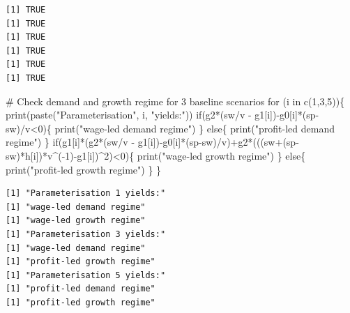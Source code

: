 \documentclass[
  letterpaper,
  DIV=11,
  numbers=noendperiod]{scrreprt}
\newenvironment{Shaded}{\begin{snugshade}}{\end{snugshade}}
\newcommand{\CommentTok}[1]{\textcolor[rgb]{0.37,0.37,0.37}{#1}}
\newcommand{\ControlFlowTok}[1]{\textcolor[rgb]{0.00,0.23,0.31}{#1}}
\newcommand{\DecValTok}[1]{\textcolor[rgb]{0.68,0.00,0.00}{#1}}
\newcommand{\FunctionTok}[1]{\textcolor[rgb]{0.28,0.35,0.67}{#1}}
\newcommand{\NormalTok}[1]{\textcolor[rgb]{0.00,0.23,0.31}{#1}}
\newcommand{\SpecialCharTok}[1]{\textcolor[rgb]{0.37,0.37,0.37}{#1}}
\newcommand{\StringTok}[1]{\textcolor[rgb]{0.13,0.47,0.30}{#1}}
\begin{document}
\begin{verbatim}
[1] TRUE
[1] TRUE
[1] TRUE
[1] TRUE
[1] TRUE
[1] TRUE
\end{verbatim}

\begin{Shaded}
\begin{Highlighting}[]
\CommentTok{\# Check demand and growth regime for 3 baseline scenarios}
\ControlFlowTok{for}\NormalTok{ (i }\ControlFlowTok{in} \FunctionTok{c}\NormalTok{(}\DecValTok{1}\NormalTok{,}\DecValTok{3}\NormalTok{,}\DecValTok{5}\NormalTok{))\{}
\FunctionTok{print}\NormalTok{(}\FunctionTok{paste}\NormalTok{(}\StringTok{"Parameterisation"}\NormalTok{, i, }\StringTok{"yields:"}\NormalTok{))   }
\ControlFlowTok{if}\NormalTok{(g2}\SpecialCharTok{*}\NormalTok{(sw}\SpecialCharTok{/}\NormalTok{v }\SpecialCharTok{{-}}\NormalTok{ g1[i])}\SpecialCharTok{{-}}\NormalTok{g0[i]}\SpecialCharTok{*}\NormalTok{(sp}\SpecialCharTok{{-}}\NormalTok{sw)}\SpecialCharTok{/}\NormalTok{v}\SpecialCharTok{\textless{}}\DecValTok{0}\NormalTok{)\{}
  \FunctionTok{print}\NormalTok{(}\StringTok{"wage{-}led demand regime"}\NormalTok{)}
\NormalTok{  \} }\ControlFlowTok{else}\NormalTok{\{}
   \FunctionTok{print}\NormalTok{(}\StringTok{"profit{-}led demand regime"}\NormalTok{)}
\NormalTok{  \}}
\ControlFlowTok{if}\NormalTok{(g1[i]}\SpecialCharTok{*}\NormalTok{(g2}\SpecialCharTok{*}\NormalTok{(sw}\SpecialCharTok{/}\NormalTok{v }\SpecialCharTok{{-}}\NormalTok{ g1[i])}\SpecialCharTok{{-}}\NormalTok{g0[i]}\SpecialCharTok{*}\NormalTok{(sp}\SpecialCharTok{{-}}\NormalTok{sw)}\SpecialCharTok{/}\NormalTok{v)}\SpecialCharTok{+}\NormalTok{g2}\SpecialCharTok{*}\NormalTok{(((sw}\SpecialCharTok{+}\NormalTok{(sp}\SpecialCharTok{{-}}\NormalTok{sw)}\SpecialCharTok{*}\NormalTok{h[i])}\SpecialCharTok{*}\NormalTok{v}\SpecialCharTok{\^{}}\NormalTok{(}\SpecialCharTok{{-}}\DecValTok{1}\NormalTok{)}\SpecialCharTok{{-}}\NormalTok{g1[i])}\SpecialCharTok{\^{}}\DecValTok{2}\NormalTok{)}\SpecialCharTok{\textless{}}\DecValTok{0}\NormalTok{)\{}
  \FunctionTok{print}\NormalTok{(}\StringTok{"wage{-}led growth regime"}\NormalTok{)}
\NormalTok{  \} }\ControlFlowTok{else}\NormalTok{\{}
  \FunctionTok{print}\NormalTok{(}\StringTok{"profit{-}led growth regime"}\NormalTok{)}
\NormalTok{  \}  }
\NormalTok{\} }
\end{Highlighting}
\end{Shaded}

\begin{verbatim}
[1] "Parameterisation 1 yields:"
[1] "wage-led demand regime"
[1] "wage-led growth regime"
[1] "Parameterisation 3 yields:"
[1] "wage-led demand regime"
[1] "profit-led growth regime"
[1] "Parameterisation 5 yields:"
[1] "profit-led demand regime"
[1] "profit-led growth regime"
\end{verbatim}
\end{document}
